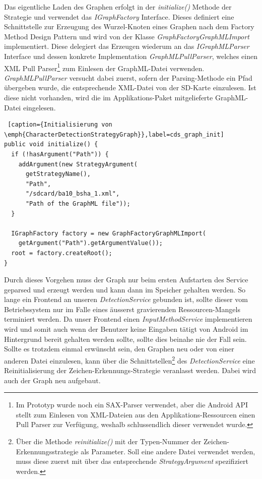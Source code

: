 Das eigentliche Laden des Graphen erfolgt in der \emph{initialize()} Methode der Strategie und verwendet das \emph{IGraphFactory} Interface. Dieses definiert eine Schnittstelle zur Erzeugung des Wurzel-Knoten eines Graphen nach dem Factory Method Design Pattern\cite[S.107-116]{designpatterns} und wird von der Klasse \emph{GraphFactoryGraphMLImport} implementiert. Diese delegiert das Erzeugen wiederum an das \emph{IGraphMLParser} Interface und dessen konkrete Implementation \emph{GraphMLPullParser}, welches einen XML Pull Parser\footnote{Im Prototyp wurde noch ein SAX-Parser verwendet, aber die Android API stellt zum Einlesen von XML-Dateien aus den Applikations-Ressourcen einen Pull Parser zur Verfügung, weshalb schlussendlich dieser verwendet wurde.} zum Einlesen der GraphML-Datei verwenden. \emph{GraphMLPullParser} versucht dabei zuerst, sofern der Parsing-Methode ein Pfad übergeben wurde, die entsprechende XML-Datei von der SD-Karte einzulesen. Ist diese nicht vorhanden, wird die im Applikations-Paket mitgelieferte GraphML-Datei eingelesen.

\begin{lstlisting} [caption={Initialisierung von \emph{CharacterDetectionStrategyGraph}},label=cds_graph_init]
public void initialize() {
  if (!hasArgument("Path")) {
    addArgument(new StrategyArgument(
      getStrategyName(), 
      "Path", 
      "/sdcard/ba10_bsha_1.xml", 
      "Path of the GraphML file"));
  }

  IGraphFactory factory = new GraphFactoryGraphMLImport(
    getArgument("Path").getArgumentValue());
  root = factory.createRoot();	
}
\end{lstlisting}

Durch dieses Vorgehen muss der Graph nur beim ersten Aufstarten des Service geparsed und erzeugt werden und kann dann im Speicher gehalten werden. So lange ein Frontend an unseren \emph{DetectionService} gebunden ist, sollte dieser vom Betriebssystem nur im Falle eines äusserst gravierenden Ressourcen-Mangels terminiert werden. Da unser Frontend einen \emph{InputMethodService} implementieren wird und somit auch wenn der Benutzer keine Eingaben tätigt von Android im Hintergrund bereit gehalten werden sollte, sollte dies beinahe nie der Fall sein. Sollte es trotzdem einmal erwünscht sein, den Graphen neu oder von einer anderen Datei einzulesen, kann über die Schnittstellen\footnote{Über die Methode \emph{reinitialize()} mit der Typen-Nummer der Zeichen-Erkennungsstrategie als Parameter. Soll eine andere Datei verwendet werden, muss diese zuerst mit über das entsprechende \emph{StrategyArgument} spezifiziert werden.} des \emph{DetectionService} eine Reinitialisierung der Zeichen-Erkennungs-Strategie veranlasst werden. Dabei wird auch der Graph neu aufgebaut.

